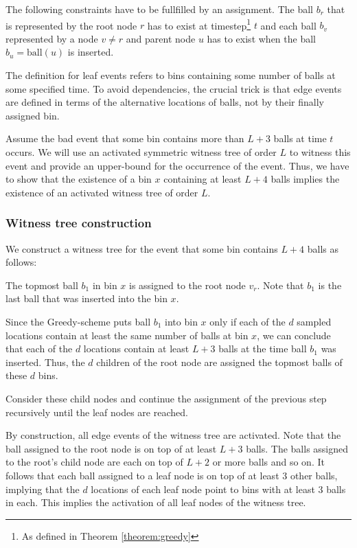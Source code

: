 \documentclass[a4paper,12pt]{article}
\begin{document}
The following constraints have to be fullfilled by an assignment. The ball $b_r$ that is represented by the root node $r$ has to exist at timestep\footnote{As defined in Theorem \ref{theorem:greedy}} $t$ and each ball $b_v$ represented by a node $v \neq r$ and parent node $u$ has to exist when the ball $b_u = \mathrm{ball}(u)$ is inserted.

The definition for leaf events refers to bins containing some number of balls at some specified time. To avoid dependencies, the crucial trick is that edge events are defined in terms of the alternative locations of balls, not by their finally assigned bin. 

Assume the bad event that some bin contains more than $L+3$ balls at time $t$ occurs. We will use an activated symmetric witness tree of order $L$ to witness this event and provide an upper-bound for the occurrence of the event. Thus, we have to show that the existence of a bin $x$ containing at least $L+4$ balls implies the existence of an activated witness tree of order $L$. 

\subsubsection{Witness tree construction}
\label{sec:constructionSymWT}
We construct a witness tree for the event that some bin contains $L+4$ balls as follows:
\begin{compactenum}
\item The topmost ball $b_1$ in bin $x$ is assigned to the root node $v_r$. Note that $b_1$ is the last ball that was inserted into the bin $x$.
\item Since the Greedy-scheme puts ball $b_1$ into bin $x$ only if each of the $d$ sampled locations contain at least the same number of balls at bin $x$, we can conclude that each of the $d$ locations contain at least $L+3$ balls at the time ball $b_1$ was inserted. Thus, the $d$ children of the root node are assigned the topmost balls of these $d$ bins.
\item Consider these child nodes and continue the assignment of the previous step recursively until the leaf nodes are reached.  
\end{compactenum}

By construction, all edge events of the witness tree are activated. Note that the ball assigned to the root node is on top of at least $L+3$ balls. The balls assigned to the root's child node are each on top of $L+2$ or more balls and so on. It follows that each ball assigned to a leaf node is on top of at least 3 other balls, implying that the $d$ locations of each leaf node point to bins with at least 3 balls in each. This implies the activation of all leaf nodes of the witness tree.
\end{document}

